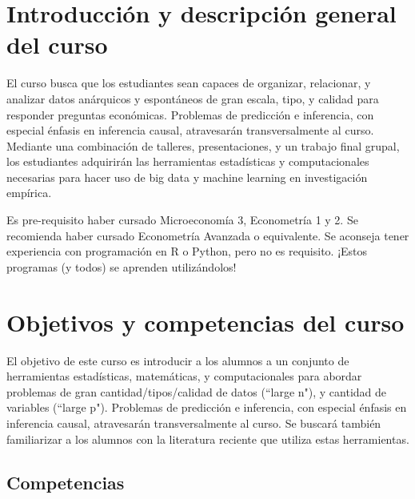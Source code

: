 \documentclass[11pt]{article}
\begin{document}
\section{Introducción y descripción general del curso}

El curso busca que los estudiantes sean capaces de organizar, relacionar, y analizar datos anárquicos y espontáneos de gran escala, tipo, y calidad para responder preguntas económicas. Problemas de predicción e inferencia, con especial énfasis en inferencia causal, atravesarán transversalmente al curso. Mediante una combinación de talleres, presentaciones, y un trabajo final grupal, los estudiantes adquirirán las herramientas estadísticas y computacionales necesarias para hacer uso de big data y machine learning en investigación empírica.

Es pre-requisito haber cursado Microeconomía 3, Econometría 1 y 2. Se recomienda haber cursado Econometría Avanzada o equivalente. Se aconseja tener experiencia con programación en R o Python, pero no es requisito. ¡Estos programas (y todos) se aprenden utilizándolos! 



\section{Objetivos y competencias del curso}


El objetivo de este curso es introducir a los alumnos a un conjunto de herramientas estadísticas, matemáticas, y computacionales para abordar problemas de gran cantidad/tipos/calidad de datos (“large n"), y cantidad de variables (“large p"). Problemas de predicción e inferencia, con especial énfasis en inferencia causal, atravesarán transversalmente al curso. Se buscará también familiarizar a los alumnos con la literatura reciente que utiliza estas herramientas. 


\subsection*{Competencias}
\end{document}
